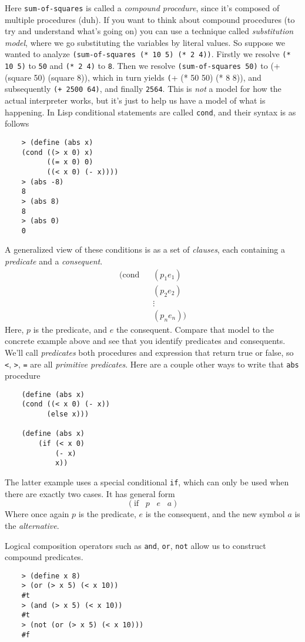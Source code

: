 \documentclass[11pt]{article}
\newcommand{\inline}{\texttt}
\begin{document}
Here \inline{sum-of-squares} is called a \emph{compound procedure}, since it's composed of multiple procedures (duh). If you want to think about compound procedures (to try and understand what's going on) you can use a technique called \emph{substitution model}, where we go substituting the variables by literal values. So suppose we wanted to analyze \inline{(sum-of-squares (* 10 5) (* 2 4))}. Firstly we resolve \inline{(* 10 5)} to \inline{50} and \inline{(* 2 4)} to \inline{8}. Then we resolve \inline{(sum-of-squares 50)} to (+ (square 50) (square 8)), which in turn yields \inline(+ (* 50 50) (* 8 8)), and subsequently \inline{(+ 2500 64)}, and finally \inline{2564}. This is \emph{not} a model for how the actual interpreter works, but it's just to help us have a model of what is happening.
\newpage
In Lisp conditional statements are called \inline{cond}, and their syntax is as follows
\begin{verbatim}
    > (define (abs x)
    (cond ((> x 0) x)
          ((= x 0) 0)
          ((< x 0) (- x))))
    > (abs -8)
    8
    > (abs 8)
    8
    > (abs 0)
    0
\end{verbatim}
A generalized view of these conditions is as a set of \emph{clauses}, each containing a \emph{predicate} and a \emph{consequent}.
\begin{align*}
    (\text{cond}\hspace{10pt}&(p_1 e_1)\\
                             &(p_2 e_2)\\
                             &\vdots \\
                             &(p_n e_n))
\end{align*}
Here, \(p \) is the predicate, and \(e \) the consequent. Compare that model to the concrete example above and see that you identify predicates and consequents. We'll call \emph{predicates} both procedures and expression that return true or false, so \inline{<}, \inline{>}, \inline{=} are all \emph{primitive predicates}. Here are a couple other ways to write that \inline{abs} procedure
\begin{verbatim}
    (define (abs x)
    (cond ((< x 0) (- x))
          (else x)))

    (define (abs x)
        (if (< x 0)
            (- x)
            x))
\end{verbatim}
The latter example uses a special conditional \inline{if}, which can only be used when there are exactly two cases. It has general form
\[
    (\text{if}\hspace{10pt}p\hspace{10pt}e\hspace{10pt}a)
\]
Where once again \(p \) is the predicate, \( e \) is the consequent, and the new symbol \(a \) is the \emph{alternative}.

Logical composition operators such as \inline{and}, \inline{or}, \inline{not} allow us to construct compound predicates.
\begin{verbatim}
    > (define x 8)
    > (or (> x 5) (< x 10))
    #t
    > (and (> x 5) (< x 10))
    #t
    > (not (or (> x 5) (< x 10)))
    #f
\end{verbatim}
\end{document}
